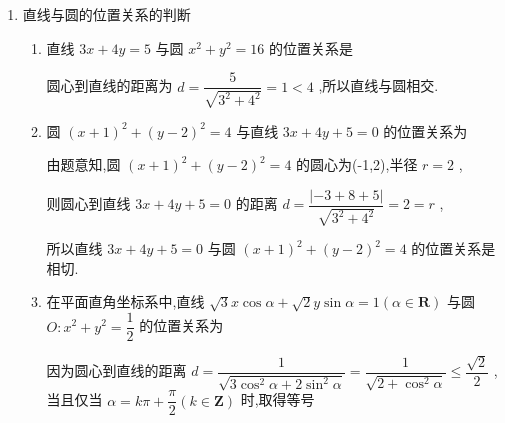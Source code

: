 \begin{enumerate}
\begin{enumerate}
\begin{jieda}
\begin{dingautolist}{172}
                设 $M\left( {-4,0}\right)$ ,则 $\left| {PC}\right|  = \dfrac{1}{2}\left| {PM}\right|$ 
            \end{dingautolist}
            

            所以 $2\left| {PC}\right|  + \left| {PD}\right|  = \left| {PM}\right|  + \left| {PD}\right|  \geq  \left| {MD}\right|  = \sqrt{17}$ ,
            当且仅当 $P,M,D$ 三点共线时取等号,
            所以 $2\left| {PC}\right|  + \left| {PD}\right|$ 的最小值为 $\sqrt{17}$ .
        \end{jieda}
    \end{enumerate}
    \item 直线与圆的位置关系的判断
    \begin{enumerate}
        \item 直线 ${3x} + {4y} = 5$ 与圆 ${x}^{2} + {y}^{2} = {16}$ 的位置关系是
        \begin{jieda}
            圆心到直线的距离为 $d = \dfrac{5}{\sqrt{{3}^{2} + {4}^{2}}} = 1 < 4$ ,所以直线与圆相交.
        \end{jieda}
        \item 圆 ${\left( x + 1\right) }^{2} + {\left( y - 2\right) }^{2} = 4$ 与直线 ${3x} + {4y} + 5 = 0$ 的位置关系为
        \begin{jieda}
            由题意知,圆 ${\left( x + 1\right) }^{2} + {\left( y - 2\right) }^{2} = 4$ 的圆心为(-1,2),半径 $r = 2$ ,
            
            则圆心到直线 ${3x} + {4y} + 5 = 0$ 的距离 $d = \dfrac{\left| -3 + 8 + 5\right| }{\sqrt{{3}^{2} + {4}^{2}}} = 2 = r$ ,
            
            所以直线 ${3x} + {4y} + 5 = 0$ 与圆 ${\left( x + 1\right) }^{2} + {\left( y - 2\right) }^{2} = 4$ 的位置关系是相切.
        \end{jieda}
        \item 在平面直角坐标系中,直线 $\sqrt{3}x\cos \alpha  + \sqrt{2}y\sin \alpha  = 1\left( {\alpha  \in  \mathbf{R}}\right)$ 与圆 $O : {x}^{2} + {y}^{2} = \dfrac{1}{2}$ 的位置关系为
        \begin{jieda}
            因为圆心到直线的距离 $d = \dfrac{1}{\sqrt{3{\cos }^{2}\alpha  + 2{\sin }^{2}\alpha }} = \dfrac{1}{\sqrt{2 + {\cos }^{2}\alpha }} \leq  \dfrac{\sqrt{2}}{2}$ ,当且仅当 $\alpha  = {k\pi } + \dfrac{\pi }{2}\left( {k \in  \mathbf{Z}}\right)$ 时,取得等号
            

\end{jieda}
\end{enumerate}
\end{enumerate}
